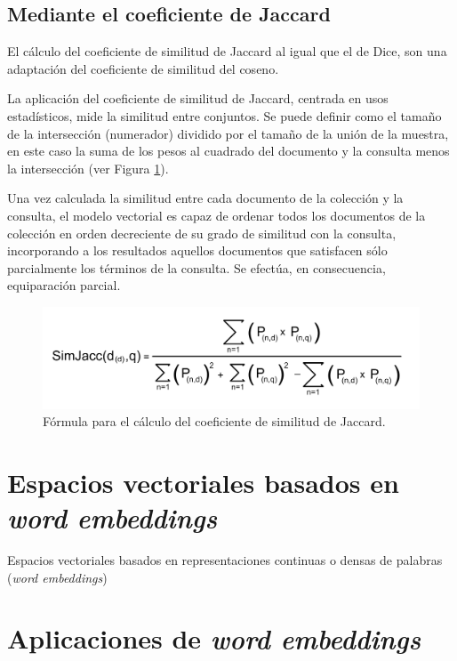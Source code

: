 \documentclass{article}
\begin{document}
\subsection{Mediante el coeficiente de Jaccard}

El cálculo del coeficiente de similitud de Jaccard al igual que el de Dice, son una adaptación del coeficiente de similitud del coseno. 

La aplicación del coeficiente de similitud de Jaccard, centrada en usos estadísticos, mide la similitud entre conjuntos. Se puede definir como el tamaño de la intersección (numerador) dividido por el tamaño de la unión de la muestra, en este caso la suma de los pesos al cuadrado del documento y la consulta menos la intersección (ver Figura \ref{fig: Figure 5}).

Una vez calculada la similitud entre cada documento de la colección y la consulta, el modelo vectorial es capaz de ordenar todos los documentos de la colección en orden decreciente de su grado de similitud con la consulta, incorporando a los resultados aquellos documentos que satisfacen sólo parcialmente los términos de la consulta. Se efectúa, en consecuencia, equiparación parcial.

\begin{figure}[h]
	\begin{center}
		\includegraphics*[scale=0.5]{similitud_jaccard.png}
	\end{center}
	\caption{Fórmula para el cálculo del coeficiente de similitud de Jaccard.}
	\label{fig: Figure 5}
\end{figure}

\section{Espacios vectoriales basados en \textit{word embeddings}}

Espacios vectoriales basados en representaciones continuas o densas de	palabras (\textit{word embeddings})

\section{Aplicaciones de \textit{word embeddings}}
\end{document}
